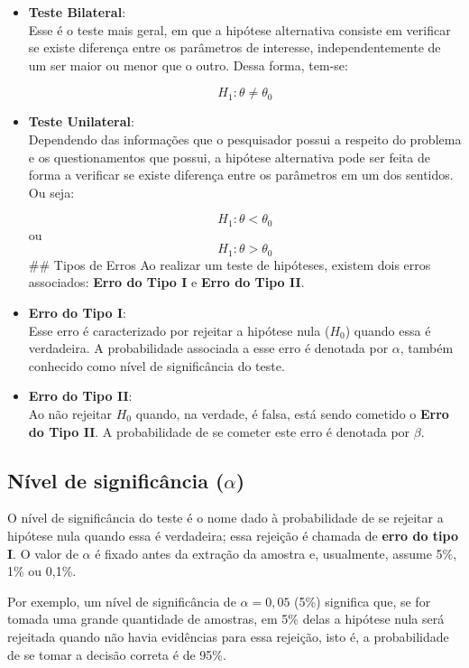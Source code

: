 \documentclass[
]{estat/estat}
\begin{document}
\begin{itemize}
\item
  \textbf{Teste Bilateral}:\\
  Esse é o teste mais geral, em que a hipótese alternativa consiste em
  verificar se existe diferença entre os parâmetros de interesse,
  independentemente de um ser maior ou menor que o outro. Dessa forma,
  tem-se:

  \[ H_{1}: \theta \neq \theta_{0} \]
\item
  \textbf{Teste Unilateral}:\\
  Dependendo das informações que o pesquisador possui a respeito do
  problema e os questionamentos que possui, a hipótese alternativa pode
  ser feita de forma a verificar se existe diferença entre os parâmetros
  em um dos sentidos. Ou seja:

  \[ H_{1}: \theta < \theta_{0} \] ou \[ H_{1}: \theta > \theta_{0} \]
  \#\# Tipos de Erros Ao realizar um teste de hipóteses, existem dois
  erros associados: \textbf{Erro do Tipo I} e \textbf{Erro do Tipo II}.
\item
  \textbf{Erro do Tipo I}:\\
  Esse erro é caracterizado por rejeitar a hipótese nula (\(H_{0}\))
  quando essa é verdadeira. A probabilidade associada a esse erro é
  denotada por \(\alpha\), também conhecido como nível de significância
  do teste.
\item
  \textbf{Erro do Tipo II}:\\
  Ao não rejeitar \(H_{0}\) quando, na verdade, é falsa, está sendo
  cometido o \textbf{Erro do Tipo II}. A probabilidade de se cometer
  este erro é denotada por \(\beta\).
\end{itemize}

\hypertarget{nuxedvel-de-significuxe2ncia-alpha}{%
\subsection{\texorpdfstring{Nível de significância
(\(\alpha\))}{Nível de significância (\textbackslash alpha)}}\label{nuxedvel-de-significuxe2ncia-alpha}}

O nível de significância do teste é o nome dado à probabilidade de se
rejeitar a hipótese nula quando essa é verdadeira; essa rejeição é
chamada de \textbf{erro do tipo I}. O valor de \(\alpha\) é fixado antes
da extração da amostra e, usualmente, assume 5\%, 1\% ou 0,1\%.

Por exemplo, um nível de significância de \(\alpha=0,05\) (5\%)
significa que, se for tomada uma grande quantidade de amostras, em 5\%
delas a hipótese nula será rejeitada quando não havia evidências para
essa rejeição, isto é, a probabilidade de se tomar a decisão correta é
de 95\%.
\end{document}
